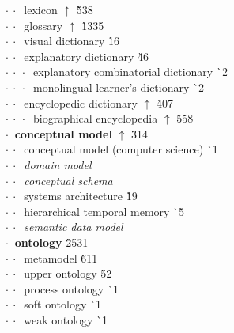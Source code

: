 \begin{tabbing}
$\cdot\:\cdot\:$  lexicon $\uparrow$ \` 5{\raisebox{.4\height}{\scalebox{.6}{+}}}38\\
$\cdot\:\cdot\:$  glossary $\uparrow$ \` 13{\raisebox{.4\height}{\scalebox{.6}{+}}}35\\
$\cdot\:\cdot\:$  visual dictionary  \` 1{\raisebox{.4\height}{\scalebox{.6}{+}}}6\\
$\cdot\:\cdot\:$  explanatory dictionary  \` 4{\raisebox{.4\height}{\scalebox{.6}{+}}}6\\
$\cdot\:\cdot\:\cdot\:$  explanatory combinatorial dictionary  \` {\raisebox{.4\height}{\scalebox{.6}{+}}}2\\
$\cdot\:\cdot\:\cdot\:$  monolingual learner's dictionary  \` {\raisebox{.4\height}{\scalebox{.6}{+}}}2\\
$\cdot\:\cdot\:$  encyclopedic dictionary $\uparrow$ \` 40{\raisebox{.4\height}{\scalebox{.6}{+}}}7\\
$\cdot\:\cdot\:\cdot\:$  biographical encyclopedia $\uparrow$ \` 55{\raisebox{.4\height}{\scalebox{.6}{+}}}8\\
$\cdot\:$  \textbf{conceptual model} $\uparrow$ \` 3{\raisebox{.4\height}{\scalebox{.6}{+}}}14\\
$\cdot\:\cdot\:$  conceptual model (computer science)  \` {\raisebox{.4\height}{\scalebox{.6}{+}}}1\\
$\cdot\:\cdot\:$  \textit{domain model}\\
$\cdot\:\cdot\:$  \textit{conceptual schema}\\
$\cdot\:\cdot\:$  systems architecture  \` 1{\raisebox{.4\height}{\scalebox{.6}{+}}}9\\
$\cdot\:\cdot\:$  hierarchical temporal memory  \` {\raisebox{.4\height}{\scalebox{.6}{+}}}5\\
$\cdot\:\cdot\:$  \textit{semantic data model}\\
$\cdot\:$  \textbf{ontology}  \` 25{\raisebox{.4\height}{\scalebox{.6}{+}}}31\\
$\cdot\:\cdot\:$  metamodel  \` 6{\raisebox{.4\height}{\scalebox{.6}{+}}}11\\
$\cdot\:\cdot\:$  upper ontology  \` 5{\raisebox{.4\height}{\scalebox{.6}{+}}}2\\
$\cdot\:\cdot\:$  process ontology  \` {\raisebox{.4\height}{\scalebox{.6}{+}}}1\\
$\cdot\:\cdot\:$  soft ontology  \` {\raisebox{.4\height}{\scalebox{.6}{+}}}1\\
$\cdot\:\cdot\:$  weak ontology  \` {\raisebox{.4\height}{\scalebox{.6}{+}}}1\\

\end{tabbing}

